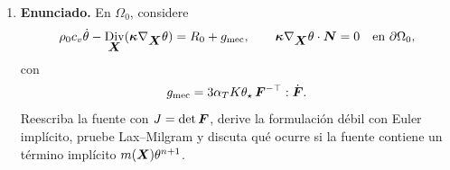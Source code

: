 \documentclass[11pt]{article}
\newcommand{\norm}[1]{\left\lVert #1\right\rVert}
\newcommand{\abs}[1]{\left|#1\right|}
\def\vec   #1{\mbox{\boldmath $#1$}{}}
\def\ten   #1{\mbox{\boldmath $#1$}{}}
\DeclareMathOperator{\dive}{div}
\DeclareMathOperator{\Div}{Div}
\begin{document}
\begin{enumerate}[label=\textbf{\arabic*.}, leftmargin=*]
\begin{enumerate}[label=(\alph*)]
        \item Si $F=0$, tomamos $\vec w=\vec v$ y $q=p$. Como $b(\vec v,p)=0$,
        \[
            a(\vec v,\vec v)=0.
        \]
        Por coercividad, $\vec v=\vec0$. La primera ecuación queda
        \[
            b(\vec w,p)=0\qquad\forall \vec w\in V.
        \]
        Aplicando la inf--sup,
        \[
            \beta\norm{p}_{L^2}
            \le
            \sup_{\vec w\in V\setminus\{\vec0\}}
            \frac{\abs{b(\vec w,p)}}{\norm{\vec w}_{H^1}}
            =0.
        \]
        Así, $p=0$. La coercividad identifica la velocidad; la inf--sup identifica la presión.

        \item Para la estabilidad de $\vec v$, usamos nuevamente $\vec w=\vec v$ y $q=p$:
        \[
            a(\vec v,\vec v)=F(\vec v).
        \]
        Entonces
        \[
            c\norm{\vec v}_{H^1}^2
            \le
            \norm{F}_{V'}\norm{\vec v}_{H^1},
            \qquad
            \norm{\vec v}_{H^1}\le C\norm{F}_{V'}.
        \]
        Para $p$, de la primera ecuación,
        \[
            b(\vec w,p)=F(\vec w)-a(\vec v,\vec w).
        \]
        Por inf--sup y continuidad de $a$,
        \[
            \beta\norm{p}_{L^2}
            \le
            \norm{F}_{V'}+C\norm{\vec v}_{H^1}
            \le C\norm{F}_{V'}.
        \]
        En consecuencia,
        \[
            \norm{\vec v}_{H^1(\Omega)}+\norm{p}_{L^2(\Omega)}
            \le C\norm{F}_{V'}.
        \]

        \item Si $\alpha=0$, todavía
        \[
            a(\vec w,\vec w)=2\mu\norm{D(\vec w)}_{L^2}^2,
        \]
        y Korn entrega coercividad porque $\mu>0$. En cambio, si $\mu=0$,
        \[
            a(\vec w,\vec w)=\alpha\norm{\vec w}_{L^2}^2,
        \]
        lo que no controla $\norm{\vec w}_{H^1}$. Por eso el límite puramente Darcy no queda cubierto por esta formulación en $H^1_0(\Omega)^d$; requiere otro marco funcional, típicamente con velocidades en $H(\dive;\Omega)$.
    \end{enumerate}

    \item \textbf{Enunciado.} En $\Omega_0$, considere
    \[
        \rho_0c_v\dot\theta-\Div_{\vec X}(\ten\kappa\nabla_{\vec X}\theta)
        =
        R_0+g_{\mathrm{mec}},
        \qquad
        \ten\kappa\nabla_{\vec X}\theta\cdot\vec N=0
        \quad\text{en }\partial\Omega_0,
    \]
    con
    \[
        g_{\mathrm{mec}}
        =
        3\alpha_TK\theta_\star\,\ten F^{-\top}:\dot{\ten F}.
    \]
    Reescriba la fuente con $J=\det\ten F$, derive la formulación débil con Euler implícito, pruebe Lax--Milgram y discuta qué ocurre si la fuente contiene un término implícito $m(\vec X)\theta^{n+1}$.


\end{enumerate}
\end{document}
